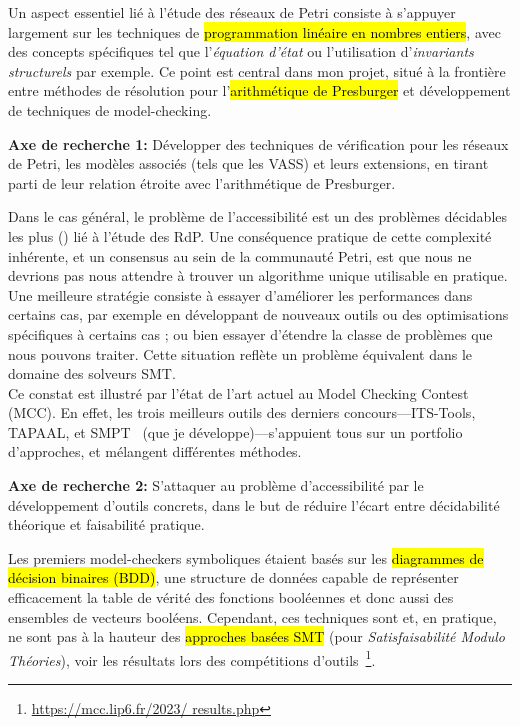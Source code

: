 Un aspect essentiel lié à l'étude des réseaux de Petri consiste à
s'appuyer largement sur les techniques de \hl{programmation linéaire en nombres
entiers}, avec des concepts spécifiques tel que l'\emph{équation d'état} ou
l'utilisation d'\emph{invariants structurels} par exemple. Ce point est central
dans mon projet, situé à la frontière entre méthodes de résolution pour
l'\hl{arithmétique de Presburger} et développement de techniques de
model-checking.

\begin{mdframed}
  \textbf{\textbf{Axe de recherche 1:}} Développer des techniques de vérification pour les réseaux
  de Petri, les modèles associés (tels que les VASS) et leurs extensions, en tirant parti de leur relation étroite avec
  l'arithmétique de Presburger.
\end{mdframed}

Dans le cas général, le problème de l'accessibilité est un des problèmes
décidables les plus  () lié à l'étude des
RdP. Une conséquence pratique de cette \og complexité inhérente\fg, et un
consensus au sein de la communauté Petri, est que nous ne devrions pas nous
attendre à trouver un algorithme unique utilisable en pratique. \\

Une meilleure stratégie consiste à essayer d'améliorer les performances dans
certains cas, par exemple en développant de nouveaux outils ou des optimisations
spécifiques à certains cas ; ou bien essayer d'étendre la classe de problèmes
que nous pouvons traiter. Cette situation reflète un problème équivalent dans le
domaine des solveurs SMT.\\

Ce constat est illustré par l'état de l'art actuel au Model Checking Contest
(MCC). En effet, les trois meilleurs outils des derniers
concours---\textsf{ITS-Tools},
\textsf{TAPAAL}, et \textsf{SMPT}~\cite{amat_smpt_2023}
(que je développe)---s'appuient tous sur un portfolio d'approches, et mélangent
différentes méthodes.

\begin{mdframed}
  \textbf{\textbf{Axe de recherche 2:}} S'attaquer au problème d'accessibilité
  par le développement d'outils
  concrets, dans le but de réduire l'écart entre décidabilité théorique et
  faisabilité pratique.
\end{mdframed}

Les premiers model-checkers symboliques étaient basés sur les \hl{diagrammes de
décision binaires (BDD)}, une structure de données capable de représenter
efficacement la table de vérité des fonctions booléennes et donc aussi des
ensembles de vecteurs booléens. Cependant, ces techniques sont  et, en pratique, ne sont pas à la hauteur des \hl{approches
basées SMT} (pour \emph{Satisfaisabilité Modulo Théories}), voir les résultats
lors des compétitions d'outils~\footnote{\url{https://mcc.lip6.fr/2023/
results.php}}.\\

